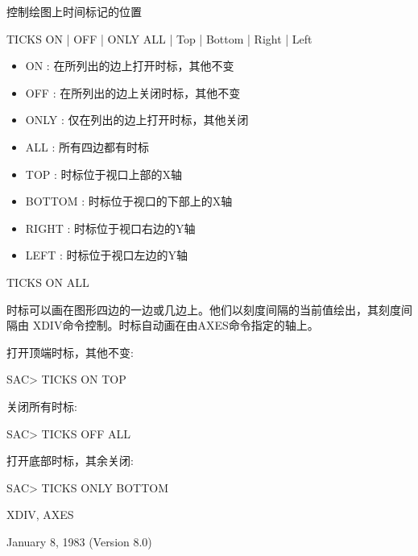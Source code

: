 \label{cmd:ticks}

控制绘图上时间标记的位置

TICKS ON | OFF | ONLY  ALL | Top | Bottom | Right | Left

\begin{itemize}
\item ON : 在所列出的边上打开时标，其他不变 
\item OFF : 在所列出的边上关闭时标，其他不变 
\item ONLY : 仅在列出的边上打开时标，其他关闭 
\item ALL : 所有四边都有时标 
\item TOP : 时标位于视口上部的X轴 
\item BOTTOM : 时标位于视口的下部上的X轴 
\item RIGHT : 时标位于视口右边的Y轴 
\item LEFT : 时标位于视口左边的Y轴 
\end{itemize}

TICKS ON ALL

时标可以画在图形四边的一边或几边上。他们以刻度间隔的当前值绘出，其刻度间隔由	XDIV命令控制。时标自动画在由AXES命令指定的轴上。

打开顶端时标，其他不变:
\begin{SACCode}
SAC> TICKS ON TOP
\end{SACCode}

关闭所有时标:
\begin{SACCode}
SAC> TICKS OFF ALL
\end{SACCode}

打开底部时标，其余关闭:
\begin{SACCode}
SAC> TICKS ONLY BOTTOM
\end{SACCode}

XDIV, AXES

January 8, 1983 (Version 8.0)
